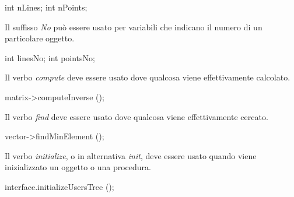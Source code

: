 \noindent\begin{minipage}[t]{\rbwidth}
\begin{RightCode}
int nLines;
int nPoints;
\end{RightCode}
\end{minipage}

Il suffisso \emph{No} può essere usato per variabili che indicano il numero di un particolare oggetto.

\noindent\begin{minipage}[t]{\rbwidth}
\begin{RightCode}
int linesNo;
int pointsNo;
\end{RightCode}
\end{minipage}

Il verbo \emph{compute} deve essere usato dove qualcosa viene effettivamente calcolato.

\noindent\begin{minipage}[t]{\rbwidth}
\begin{RightCode}
matrix->computeInverse ();
\end{RightCode}
\end{minipage} 

Il verbo \emph{find} deve essere usato dove qualcosa viene effettivamente cercato.

\noindent\begin{minipage}[t]{\rbwidth}
\begin{RightCode}
vector->findMinElement ();
\end{RightCode}
\end{minipage} 

Il verbo \emph{initialize}, o in alternativa \emph{init}, deve essere usato quando viene inizializzato un oggetto o una procedura.

\noindent\begin{minipage}[t]{\rbwidth}
\begin{RightCode}
interface.initializeUsersTree ();
\end{RightCode}
\end{minipage}

